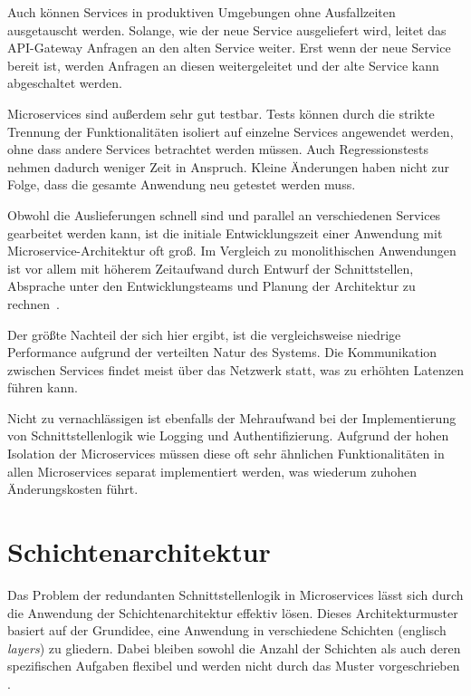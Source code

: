 \documentclass[acmtog]{acmart}
\begin{document}
Auch können Services in produktiven Umgebungen ohne Ausfallzeiten ausgetauscht werden.
Solange, wie der neue Service ausgeliefert wird, leitet das API-Gateway Anfragen an den alten Service weiter.
Erst wenn der neue Service bereit ist, werden Anfragen an diesen weitergeleitet und der alte Service kann abgeschaltet werden.

Microservices sind außerdem sehr gut testbar.
Tests können durch die strikte Trennung der Funktionalitäten isoliert auf einzelne Services angewendet werden, ohne dass andere Services betrachtet werden müssen.
Auch Regressionstests nehmen dadurch weniger Zeit in Anspruch.
Kleine Änderungen haben nicht zur Folge, dass die gesamte Anwendung neu getestet werden muss.

Obwohl die Auslieferungen schnell sind und parallel an verschiedenen Services gearbeitet werden kann, ist die initiale Entwicklungszeit einer Anwendung mit Microservice-Architektur oft groß.
Im Vergleich zu monolithischen Anwendungen ist vor allem mit höherem Zeitaufwand durch Entwurf der Schnittstellen, Absprache unter den Entwicklungsteams und Planung der Architektur zu rechnen~\cite[6-7]{evolutionOfDistributedSystems}.

Der größte Nachteil der sich hier ergibt, ist die vergleichsweise niedrige Performance aufgrund der verteilten Natur des Systems.
Die Kommunikation zwischen Services findet meist über das Netzwerk statt, was zu erhöhten Latenzen führen kann\cite[34]{architecturePatterns}.

Nicht zu vernachlässigen ist ebenfalls der Mehraufwand bei der Implementierung von Schnittstellenlogik wie Logging und Authentifizierung.
Aufgrund der hohen Isolation der Microservices müssen diese oft sehr ähnlichen Funktionalitäten in allen Microservices separat implementiert werden, was
wiederum zuhohen Änderungskosten führt.

\section{Schichtenarchitektur}
\label{sec:layered}
Das Problem der redundanten Schnittstellenlogik in Microservices lässt sich durch die
Anwendung der Schichtenarchitektur effektiv lösen. Dieses Architekturmuster basiert auf
der Grundidee, eine Anwendung in verschiedene Schichten (englisch \textit{layers})
zu gliedern. Dabei bleiben sowohl die Anzahl der Schichten als auch deren spezifischen
Aufgaben flexibel und werden nicht durch das Muster vorgeschrieben \cite[34]{layered2}.
\end{document}
